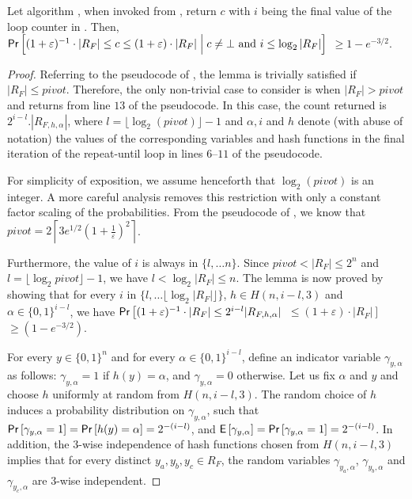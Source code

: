\begin{lemma}\label{lm:probProof}
 Let algorithm {\ApproxMCCore}, when invoked from {\ApproxMC}, return
 $c$ with $i$ being the final value of the loop counter in {\ApproxMCCore}.  
Then, $\mathsf{Pr}\left[(1 + \varepsilon)^{-1}\cdot |R_F| \le c \le (1 +
   \varepsilon)\cdot |R_F| \Bigm|  c \neq \bot \mbox{ and } i \leq \log_2 |R_F|\right]$ $\ge 1 - e^{-3/2}$.
\end{lemma}
\begin{proof}
Referring to the pseudocode of {\ApproxMCCore}, the lemma is trivially
satisfied if $|R_F| \le \mathit{pivot}$.  Therefore, the only
non-trivial case to consider is when $|R_F| > \mathit{pivot}$ and
{\ApproxMCCore} returns from line $13$ of the pseudocode.  In this
case, the count returned is $2^{i-l}.|R_{F,h,\alpha}|$, where $l =
\lfloor \log_2 (\mathit{pivot}) \rfloor - 1$ and $\alpha, i$ and $h$
denote (with abuse of notation) the values of the corresponding
variables and hash functions in the final iteration of the
repeat-until loop in lines $6$--$11$ of the pseudocode.  

For simplicity of exposition, we assume henceforth that $\log_2
(\mathit{pivot})$ is an integer.  A more careful analysis removes this
restriction with only a constant factor scaling of the probabilities.
From the pseudocode of {\ApproxMCCore}, we know that
$\mathit{pivot} =2 \left\lceil 3e^{1/2}\left(1 +
\frac{1}{\varepsilon}\right)^2 \right\rceil$.  

Furthermore, the value of $i$ is always in $\{l, \ldots n\}$.  Since
$\mathit{pivot} < |R_F| \le 2^n$ and $l = \lfloor \log_2
\mathit{pivot} \rfloor - 1$, we have $l < \log_2 |R_F| \le n$.  The
lemma is now proved by showing that for every $i$ in $\{l, \ldots
\lfloor \log_2 |R_F| \rfloor\}$, $h \in H(n, i-l, 3)$ and $\alpha \in
\{0,1\}^{i-l}$, we have $\mathsf{Pr}\left[(1 + \varepsilon)^{-1}\cdot |R_F|
  \le 2^{i-l}|R_{F,h,\alpha}|\right.$ $\left.\le (1 +
  \varepsilon)\cdot |R_F|\right]$ $\ge (1 - e^{-3/2})$.

For every $y \in \{0, 1\}^n$ and for every $\alpha \in \{0,
1\}^{i-l}$, define an indicator variable $\gamma_{y, \alpha}$ as
follows: $\gamma_{y, \alpha} = 1$ if $h(y) = \alpha$, and
$\gamma_{y,\alpha} = 0$ otherwise.  Let us fix $\alpha$ and $y$ and
choose $h$ uniformly at random from $H(n, i-l, 3)$.  The random choice
of $h$ induces a probability distribution on $\gamma_{y, \alpha}$,
such that $\mathsf{Pr}\left[\gamma_{y, \alpha} = 1\right] = \mathsf{Pr}\left[h(y)
  = \alpha\right] = 2^{-(i-l)}$, and
$\mathsf{E}\left[\gamma_{y,\alpha}\right] = \mathsf{Pr}\left[\gamma_{y, \alpha}
  = 1\right] = 2^{-(i-l)}$.  In addition, the $3$-wise independence of
hash functions chosen from $H(n, i-l, 3)$ implies that for every
distinct $y_a, y_b, y_c \in R_F$, the random variables $\gamma_{y_a,
  \alpha}$, $\gamma_{y_b, \alpha}$ and $\gamma_{y_c, \alpha}$ are
$3$-wise independent.
%
%
%
%
%
%
%
%
%


\end{proof}
